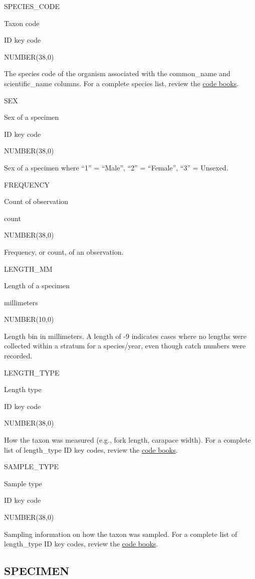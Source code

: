 \documentclass[
  letterpaper,
  oneside,
  open=any]{scrbook}
\begin{document}
SPECIES\_CODE

Taxon code

ID key code

NUMBER(38,0)

The species code of the organism associated with the common\_name and
scientific\_name columns. For a complete species list, review the
\href{https://www.fisheries.noaa.gov/resource/document/groundfish-survey-species-code-manual-and-data-codes-manual}{code
books}.

SEX

Sex of a specimen

ID key code

NUMBER(38,0)

Sex of a specimen where ``1'' = ``Male'', ``2'' = ``Female'', ``3'' =
Unsexed.

FREQUENCY

Count of observation

count

NUMBER(38,0)

Frequency, or count, of an observation.

LENGTH\_MM

Length of a specimen

millimeters

NUMBER(10,0)

Length bin in millimeters. A length of -9 indicates cases where no
lengths were collected within a stratum for a species/year, even though
catch numbers were recorded.

LENGTH\_TYPE

Length type

ID key code

NUMBER(38,0)

How the taxon was measured (e.g., fork length, carapace width). For a
complete list of length\_type ID key codes, review the
\href{https://www.fisheries.noaa.gov/resource/document/groundfish-survey-species-code-manual-and-data-codes-manual}{code
books}.

SAMPLE\_TYPE

Sample type

ID key code

NUMBER(38,0)

Sampling information on how the taxon was sampled. For a complete list
of length\_type ID key codes, review the
\href{https://www.fisheries.noaa.gov/resource/document/groundfish-survey-species-code-manual-and-data-codes-manual}{code
books}.

\subsection{SPECIMEN}\label{specimen}
\end{document}
